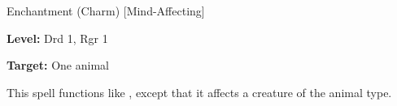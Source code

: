 
Enchantment (Charm) [Mind-Affecting]

\textbf{Level:} Drd 1, Rgr 1

\textbf{Target:} One animal

This spell functions like , except that it affects a creature 
of the animal type.

